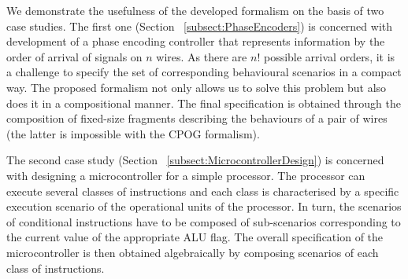 %
%
%
%
%



We demonstrate the usefulness of the developed formalism on the basis of two case
studies. The first one (Section ~\ref{subsect:PhaseEncoders}) is concerned with development of a phase encoding
controller that represents information by the order of arrival of
signals on $n$ wires. As there are $n!$ possible arrival orders,
it is a challenge to specify the set of corresponding behavioural
scenarios in a compact way. The proposed formalism not only allows us
to solve this problem but also does it in a compositional manner. The final specification is obtained through the composition of fixed-size fragments
describing the behaviours of a pair of wires (the latter is impossible
with the CPOG formalism).


The second case study (Section ~\ref{subsect:MicrocontrollerDesign}) is concerned with designing a microcontroller
for a simple processor. The processor can execute several classes
of instructions and each class is characterised by a specific execution
scenario of the operational units of the processor. In turn, the scenarios
of conditional instructions have to be composed of sub-scenarios corresponding
to the current value of the appropriate ALU flag. The overall specification
of the microcontroller is then obtained algebraically by composing
scenarios of each class of instructions.



